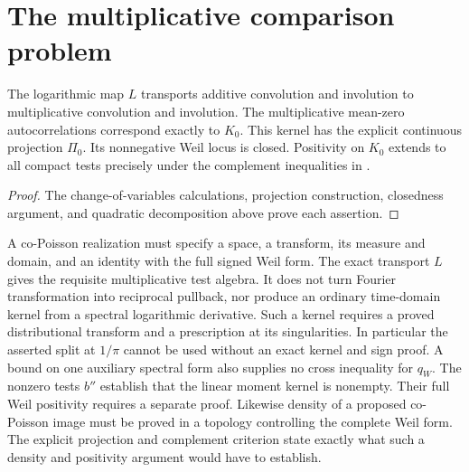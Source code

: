 \section{The multiplicative comparison problem}
\label{v4-arith:w7-i:consequences}
\begin{theorem}
\label{v4-arith:w7-i:thm:wave7-form}
The logarithmic map $L$ transports additive convolution and involution
to multiplicative convolution and involution. The multiplicative
mean-zero autocorrelations correspond exactly to $K_0$.
This kernel has the explicit continuous projection $\Pi_0$.
Its nonnegative Weil locus is closed. Positivity on $K_0$ extends
to all compact tests precisely under the complement inequalities
in .
\end{theorem}
\begin{proof}
The change-of-variables calculations, projection construction,
closedness argument, and quadratic decomposition above prove each assertion.
\end{proof}

\begin{remark}
\label{v4-arith:w7-i:rem:orthogonal-HFD}
\label{v4-arith:w7-i:rem:orthogonal-obstruction}
\label{v4-arith:w7-i:rem:honest-form}
\label{v4-arith:w7-i:rem:compare-w6}
\label{v4-arith:w7-i:rem:beilinson}
A co-Poisson realization must specify a space, a transform, its
measure and domain, and an identity with the full signed Weil form.
The exact transport $L$ gives the requisite multiplicative test
algebra. It does not turn Fourier transformation into reciprocal
pullback, nor produce an ordinary time-domain kernel from a
spectral logarithmic derivative. Such a kernel requires a proved
distributional transform and a prescription at its singularities.
In particular the asserted split at $1/\pi$ cannot be used without
an exact kernel and sign proof. A bound on one auxiliary spectral
form also supplies no cross inequality for $q_W$.
The nonzero tests $b''$ establish that the linear moment kernel is
nonempty. Their full Weil positivity requires a separate proof.
Likewise density of a proposed co-Poisson image must be proved in
a topology controlling the complete Weil form. The explicit
projection and complement criterion state exactly what such a
density and positivity argument would have to establish.
\end{remark}
